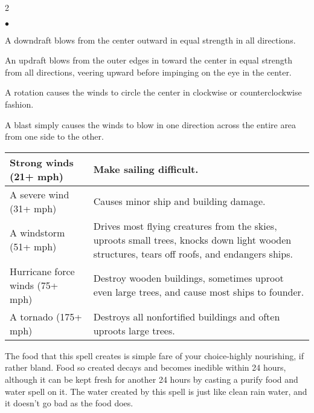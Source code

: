 \begin{multicols}{2}
\begin{small}

\begin{list}{$\bullet$}{\itemspace}
  \item A downdraft blows from the center outward in equal strength in all directions.
  \item An updraft blows from the outer edges in toward the center in equal strength from all directions, veering upward before impinging on the eye in the center.
  \item A rotation causes the winds to circle the center in clockwise or counterclockwise fashion.
  \item A blast simply causes the winds to blow in one direction across the entire area from one side to the other.
\end{list}


\begin{center}
\begin{tabular}[h!]{p{1in}|p{2in}}
Strong winds (21+ mph) & Make sailing difficult. \\ \hline
A severe wind (31+ mph) & Causes minor ship and building damage. \\ \hline
A windstorm (51+ mph) & Drives most flying creatures from the skies, uproots small trees, knocks down light wooden structures, tears off roofs, and endangers ships. \\ \hline
Hurricane force winds (75+ mph) & Destroy wooden buildings, sometimes uproot even large trees, and cause most ships to founder. \\ \hline
A tornado (175+ mph) & Destroys all nonfortified buildings and often uproots large trees. \\
\end{tabular}
\end{center}

\noindent The food that this spell creates is simple fare of your choice-highly nourishing, if rather bland. Food so created decays and becomes inedible within 24 hours, although it can be kept fresh for another 24 hours by casting a purify food and water spell on it. The water created by this spell is just like clean rain water, and it doesn't go bad as the food does.


\end{small}
\end{multicols}
